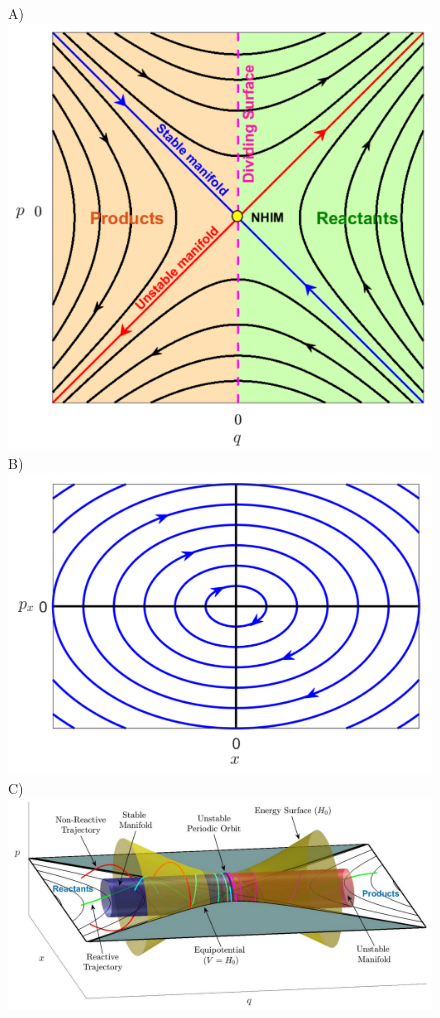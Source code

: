 \documentclass{ws-ijbc}
\begin{document}
\begin{figure}[!ht]
	\begin{center}		
		A)\includegraphics[scale=0.33]{figAppB_1a}
		B)\includegraphics[scale=0.32]{figAppB_1b}
		C)\includegraphics[scale=0.35]{figAppB_1c}	
	\end{center}


\end{figure}
\end{document}
